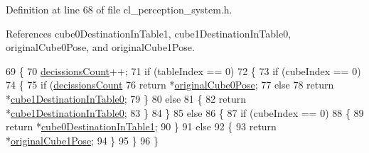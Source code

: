 Definition at line 68 of file cl\+\_\+perception\+\_\+system.\+h.



References cube0\+Destination\+In\+Table1, cube1\+Destination\+In\+Table0, original\+Cube0\+Pose, and original\+Cube1\+Pose.


\begin{DoxyCode}
69     \{
70         \hyperlink{classsm__moveit_1_1cl__perception__system_1_1ClPerceptionSystem_ab8272ccb5af7401beeb4e9eaf1d86fa3}{decissionsCount}++;
71         \textcolor{keywordflow}{if} (tableIndex == 0)
72         \{
73             \textcolor{keywordflow}{if} (cubeIndex == 0)
74             \{
75                 \textcolor{keywordflow}{if} (\hyperlink{classsm__moveit_1_1cl__perception__system_1_1ClPerceptionSystem_ab8272ccb5af7401beeb4e9eaf1d86fa3}{decissionsCount} %
76                     \textcolor{keywordflow}{return} *\hyperlink{classsm__moveit_1_1cl__perception__system_1_1ClPerceptionSystem_a763b8723ae96eb30fd21e039e3f52c47}{originalCube0Pose};
77                 \textcolor{keywordflow}{else}
78                     \textcolor{keywordflow}{return} *\hyperlink{classsm__moveit_1_1cl__perception__system_1_1ClPerceptionSystem_a13cf34b1fb711829c4ddb9a9e2899ae9}{cube1DestinationInTable0};
79             \}
80             \textcolor{keywordflow}{else}
81             \{
82                 \textcolor{keywordflow}{return} *\hyperlink{classsm__moveit_1_1cl__perception__system_1_1ClPerceptionSystem_a13cf34b1fb711829c4ddb9a9e2899ae9}{cube1DestinationInTable0};
83             \}
84         \}
85         \textcolor{keywordflow}{else}
86         \{
87             \textcolor{keywordflow}{if} (cubeIndex == 0)
88             \{
89                 \textcolor{keywordflow}{return} *\hyperlink{classsm__moveit_1_1cl__perception__system_1_1ClPerceptionSystem_ab84bbc2d5e5a7ef7839a0ade56942679}{cube0DestinationInTable1};
90             \}
91             \textcolor{keywordflow}{else}
92             \{
93                 \textcolor{keywordflow}{return} *\hyperlink{classsm__moveit_1_1cl__perception__system_1_1ClPerceptionSystem_ab8851b53535efa7e154248c119e8c3cd}{originalCube1Pose};
94             \}
95         \}
96     \}
\end{DoxyCode}
